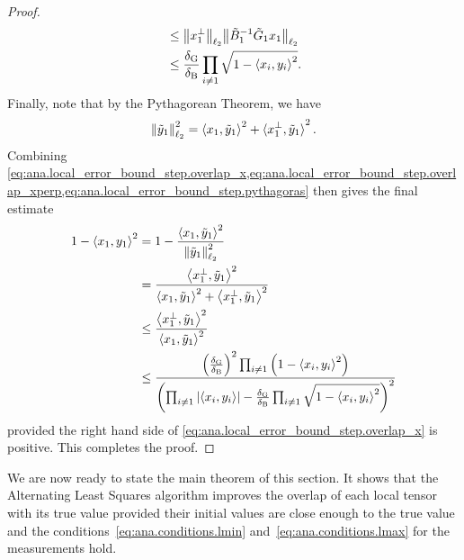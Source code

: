 \begin{proof}
\begin{align}
    &\le {\left\Vert x_1^\perp\right\Vert}_{\ell_2} {\left\Vert\tilde B_1^{-1} \tilde G_1 x_1\right\Vert}_{\ell_2} \\
    &\le \frac{\delta_\mathrm{G}}{\delta_\mathrm{B}} \prod_{i \neq 1} \sqrt{1 - {\braket{x_i, y_i}}^2}.
    \label{eq:ana.local_error_bound_step.overlap_xperp}
  \end{align}
  Finally, note that by the Pythagorean Theorem, we have
  \[
    {\left\Vert\tilde y_1\right\Vert}_{\ell_2}^2
    = \braket{x_1, \tilde y_1}^2 + \braket{x_1^\perp, \tilde y_1}^2.
    \label{eq:ana.local_error_bound_step.pythagoras}
  \]
  Combining \cref{eq:ana.local_error_bound_step.overlap_x,eq:ana.local_error_bound_step.overlap_xperp,eq:ana.local_error_bound_step.pythagoras} then gives the final estimate
  \begin{align}
    1 - \braket{x_1, y_1}^2
    &= 1 - \frac{\braket{x_1, \tilde y_1}^2}{\Ltwonorm{\tilde y_1}^2} \\
    &= \frac{  \Braket{x_1^\perp, \tilde y_1}^2  }{  \Braket{x_1, \tilde y_1}^2 + \Braket{x_1^\perp, \tilde y_1}^2  } \\
    &\le \frac{  \Braket{x_1^\perp, \tilde y_1}^2  }{  \Braket{x_1, \tilde y_1}^2  } \\
    &\le \frac{%
      {\left(\frac{\delG}{\delB}\right)}^2 \prod_{i \neq 1} \left(1 - {\braket{x_i, y_i}}^2 \right)
    }{%
      {\left( \prod_{i \neq 1} \Abs{\braket{x_i, y_i}} - \frac{\delG}{\delB} \prod_{i \neq 1} \sqrt{1 - {\braket{x_i, y_i}}^2} \right)}^2
    }
  \end{align}
  provided the right hand side of \cref{eq:ana.local_error_bound_step.overlap_x} is positive.
  This completes the proof.
\end{proof}

We are now ready to state the main theorem of this section.
It shows that the Alternating Least Squares algorithm improves the overlap of each local tensor with its true value provided their initial values are close enough to the true value and the conditions~\eqref{eq:ana.conditions.lmin} and~\eqref{eq:ana.conditions.lmax} for the measurements hold.

